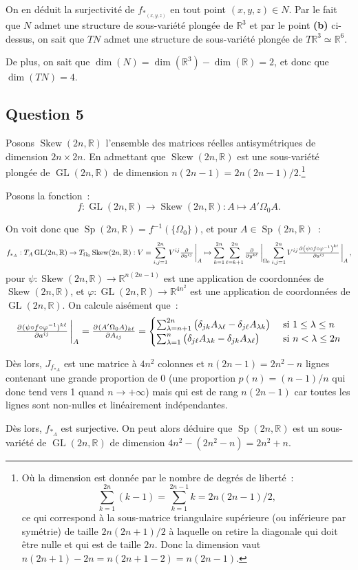 \documentclass{article}
\newcommand{\R}{\mathbb R}
\DeclareMathOperator{\GL}{GL}
\DeclareMathOperator{\Skew}{Skew}
\DeclareMathOperator{\Sp}{Sp}
\begin{document}
On en déduit la surjectivité de $f_{*_{(x, y, z)}}$ en tout point $(x, y, z) \in N$. Par le fait que $N$ admet une structure de sous-variété plongée
de $\R^3$ et par le point \textbf{(b)} ci-dessus, on sait que $TN$ admet une structure de sous-variété plongée de $T\R^3 \simeq \R^6$.

De plus, on sait que $\dim(N) = \dim(\R^3) - \dim(\R) = 2$, et donc que $\dim(TN) = 4$.


\subsection*{Question 5}
Posons $\Skew(2n, \R)$ l'ensemble des matrices réelles antisymétriques de dimension $2n \times 2n$. En admettant que $\Skew(2n, \R)$ est une sous-variété
plongée de $\GL(2n, \R)$ de dimension $n(2n-1) = 2n(2n-1)/2$.\footnote{Où la dimension est donnée par le nombre de degrés de liberté~:
\[\sum_{k=1}^{2n}(k-1) = \sum_{k=1}^{2n-1}k = 2n(2n-1)/2,\]
ce qui correspond à la sous-matrice triangulaire supérieure (ou inférieure par symétrie) de taille $2n(2n+1)/2$ à laquelle on retire la diagonale qui doit
être nulle et qui est de taille $2n$. Donc la dimension vaut $n(2n+1)-2n = n(2n+1-2)= n(2n-1)$.}

Posons la fonction~:
\[f : \GL(2n, \R) \to \Skew(2n, \R) : A \mapsto A'\Omega_0A.\]

On voit donc que $\Sp(2n, \R) = f^{-1}(\{\Omega_0\})$, et pour $A \in \Sp(2n, \R)$~:
\[f_{*_A} : T_A\GL(2n, \R) \to T_{\Omega_0}\Skew(2n, \R) : V = \sum_{i,j=1}^{2n}V^{ij}\pd {}{{a^{ij}}}\sVert[3]_A \mapsto
	\sum_{k=1}^{2n}\sum_{\ell=k+1}^{2n}\pd {}{{y^{k\ell}}}\sVert[3]_{\Omega_0}\sum_{i,j=1}^{2n}V^{ij}\pd {\left(\psi \circ f \circ \varphi^{-1}\right)^{k\ell}}{{a^{ij}}}\sVert[3]_A,\]
pour $\psi : \Skew(2n, \R) \to \R^{n(2n-1)}$ est une application de coordonnées de $\Skew(2n, \R)$, et $\varphi : \GL(2n, \R) \to \R^{4n^2}$ est une application
de coordonnées de $\GL(2n, \R)$. On calcule aisément que~:
\[\pd {(\psi \circ f \circ \varphi^{-1})^{k\ell}}{{a^{ij}}}\sVert[3]_A = \pd {(A'\Omega_0A)_{k\ell}}{{A_{ij}}} =
	\begin{cases}
		\sum_{\lambda=n+1}^{2n}\left(\delta_{jk}A_{\lambda \ell} - \delta_{j\ell}A_{\lambda k}\right) &\text{ si } 1 \leq \lambda \leq n \\
		\sum_{\lambda=1}^n\left(\delta_{j\ell}A_{\lambda k} - \delta_{jk}A_{\lambda \ell}\right) &\text{ si } n < \lambda \leq 2n
	\end{cases}\]

Dès lors, $J_{f_{*A}}$ est une matrice à $4n^2$ colonnes et $n(2n-1) = 2n^2-n$ lignes contenant une grande proportion de 0 (une proportion $p(n) =(n-1)/n$ qui donc
tend vers 1 quand $n \to +\infty$) mais qui est de rang $n(2n-1)$ car toutes les lignes sont non-nulles et linéairement indépendantes.

Dès lors, $f_{*_A}$ est surjective. On peut alors déduire que $\Sp(2n, \R)$ est un sous-variété de $\GL(2n, \R)$ de dimension $4n^2 - (2n^2 - n) = 2n^2 + n$.
\end{document}
